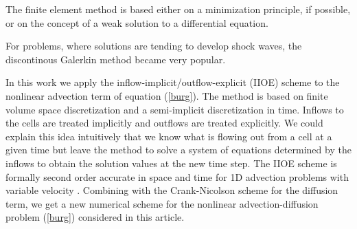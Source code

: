 \documentclass[a4paper,12pt,twoside]{report}%
\begin{document}
The finite element method is based either on a minimization principle, if possible, or on the concept of a weak solution to a differential equation. 

 For problems, where solutions are tending to develop shock waves, the discontinous Galerkin method became very popular.
\par In this work we apply the inflow-implicit\slash outflow-explicit (IIOE) scheme  to the nonlinear advection term of equation (\ref{burg}). The method is based on finite volume space discretization and a semi-implicit discretization in time. Inflows to the cells are treated implicitly and outflows are treated explicitly. We could explain this idea intuitively that we know what is flowing out from a cell at a given time but leave the method to solve a system of equations determined by the inflows to obtain the solution values at the new time step. The IIOE scheme is formally second order accurate in space and time for 1D advection problems with variable velocity \cite{iioe2}. Combining with the Crank-Nicolson scheme for the diffusion term, we get a new numerical scheme for the nonlinear advection-diffusion problem (\ref{burg}) considered in this article.
\end{document}
